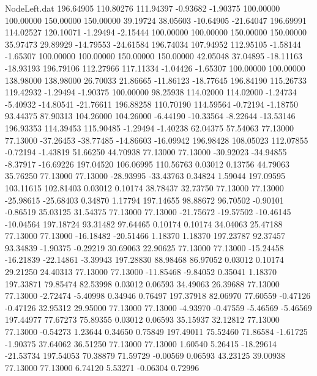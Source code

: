 \begin{filecontents}{NodeLeft.dat}
 196.64905  110.80276  111.94397    -0.93682   -1.90375  100.00000  100.00000  150.00000  150.00000   39.19724   38.05603  -10.64905  -21.64047
 196.69991  114.02527  120.10071    -1.29494   -2.15444  100.00000  100.00000  150.00000  150.00000   35.97473   29.89929  -14.79553  -24.61584
 196.74034  107.94952  112.95105    -1.58144   -1.65307  100.00000  100.00000  150.00000  150.00000   42.05048   37.04895  -18.11163  -18.93193
 196.79106  112.27966  117.11334    -1.04426   -1.65307  100.00000  100.00000  138.98000  138.98000   26.70033   21.86665  -11.86123  -18.77645
 196.84190  115.26733  119.42932    -1.29494   -1.90375  100.00000   98.25938  114.02000  114.02000   -1.24734   -5.40932  -14.80541  -21.76611
 196.88258  110.70190  114.59564    -0.72194   -1.18750   93.44375   87.90313  104.26000  104.26000   -6.44190  -10.33564   -8.22644  -13.53146
 196.93353  114.39453  115.90485    -1.29494   -1.40238   62.04375   57.54063   77.13000   77.13000  -37.26453  -38.77485  -14.86603  -16.09942
 196.98428  108.05023  112.07855    -0.72194   -1.43819   51.66250   44.70938   77.13000   77.13000  -30.92023  -34.94855   -8.37917  -16.69226
 197.04520  106.06995  110.56763     0.03012    0.13756   44.79063   35.76250   77.13000   77.13000  -28.93995  -33.43763    0.34824    1.59044
 197.09595  103.11615  102.81403     0.03012    0.10174   38.78437   32.73750   77.13000   77.13000  -25.98615  -25.68403    0.34870    1.17794
 197.14655   98.88672   96.70502    -0.90101   -0.86519   35.03125   31.54375   77.13000   77.13000  -21.75672  -19.57502  -10.46145  -10.04564
 197.18724   93.31482   97.64465     0.10174    0.10174   34.04063   25.47188   77.13000   77.13000  -16.18482  -20.51466    1.18370    1.18370
 197.23787   92.37457   93.34839    -1.90375   -0.29219   30.69063   22.90625   77.13000   77.13000  -15.24458  -16.21839  -22.14861   -3.39943
 197.28830   88.98468   86.97052     0.03012    0.10174   29.21250   24.40313   77.13000   77.13000  -11.85468   -9.84052    0.35041    1.18370
 197.33871   79.85474   82.53998     0.03012    0.06593   34.49063   26.39688   77.13000   77.13000   -2.72474   -5.40998    0.34946    0.76497
 197.37918   82.06970   77.60559    -0.47126   -0.47126   32.95312   29.95000   77.13000   77.13000   -4.93970   -0.47559   -5.46569   -5.46569
 197.44977   77.67273   75.89355     0.03012    0.06593   35.15937   32.12812   77.13000   77.13000   -0.54273    1.23644    0.34650    0.75849
 197.49011   75.52460   71.86584    -1.61725   -1.90375   37.64062   36.51250   77.13000   77.13000    1.60540    5.26415  -18.29614  -21.53734
 197.54053   70.38879   71.59729    -0.00569    0.06593   43.23125   39.00938   77.13000   77.13000    6.74120    5.53271   -0.06304    0.72996

\end{filecontents}
